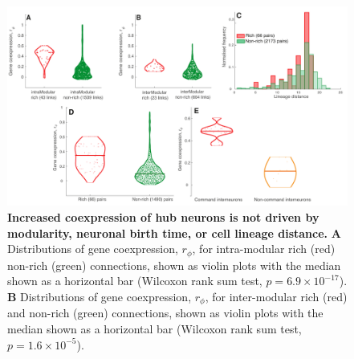 \documentclass[10pt,letterpaper]{article}
\begin{document}
{%
\begin{figure}[!h]
\centering
    \includegraphics[width=1\textwidth]{extrasALL.pdf}
 \caption{
 \textbf{Increased coexpression of hub neurons is not driven by modularity, neuronal birth time, or cell lineage distance.}
\textbf{A} Distributions of gene coexpression, $r_\phi$, for intra-modular rich (red) non-rich (green) connections, shown as violin plots with the median shown as a horizontal bar (Wilcoxon rank sum test, $p = 6.9 \times 10^{-17}$).
\textbf{B} Distributions of gene coexpression, $r_\phi$, for inter-modular rich (red) and non-rich (green) connections, shown as violin plots with the median shown as a horizontal bar (Wilcoxon rank sum test, $p = 1.6 \times 10^{-5}$).
}
\end{figure}}
\end{document}

